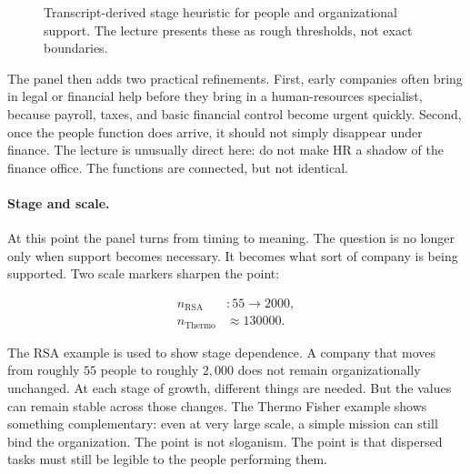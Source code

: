\begin{figure}
\centering
{}
\caption{Transcript-derived stage heuristic for people and organizational support. The lecture presents these as rough thresholds, not exact boundaries.}
\end{figure}

The panel then adds two practical refinements. First, early companies often bring in legal or financial help before they bring in a human-resources specialist, because payroll, taxes, and basic financial control become urgent quickly. Second, once the people function does arrive, it should not simply disappear under finance. The lecture is unusually direct here: do not make HR a shadow of the finance office. The functions are connected, but not identical.

\paragraph{Stage and scale.} At this point the panel turns from timing to meaning. The question is no longer only when support becomes necessary. It becomes what sort of company is being supported. Two scale markers sharpen the point:

\begin{align}
n_{\mathrm{RSA}} &: 55 \rightarrow 2000,\\
n_{\mathrm{Thermo}} &\approx 130000.
\end{align}

The RSA example is used to show stage dependence. A company that moves from roughly \(55\) people to roughly \(2{,}000\) does not remain organizationally unchanged. At each stage of growth, different things are needed. But the values can remain stable across those changes. The Thermo Fisher example shows something complementary: even at very large scale, a simple mission can still bind the organization. The point is not sloganism. The point is that dispersed tasks must still be legible to the people performing them.

